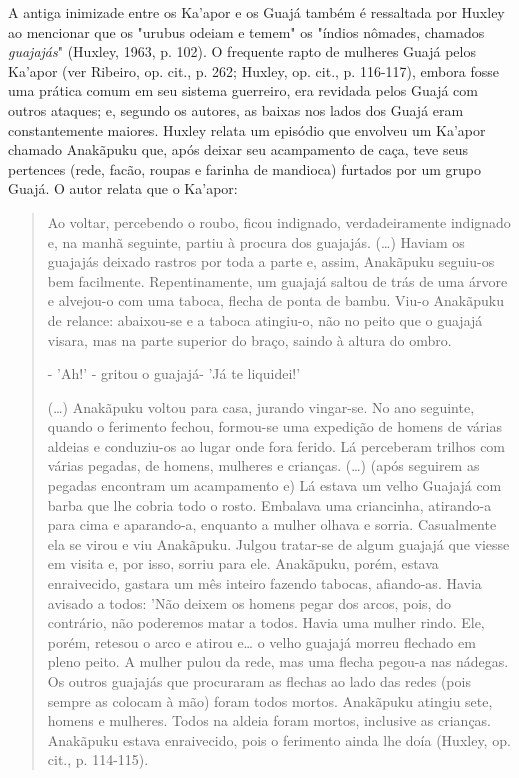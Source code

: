 A antiga inimizade entre os Ka'apor e os Guajá também é ressaltada por
Huxley ao mencionar que os "urubus odeiam e temem" os "índios nômades,
chamados \emph{guajajás}" (Huxley, 1963, p. 102). O frequente rapto de
mulheres Guajá pelos Ka'apor (ver Ribeiro, op. cit., p. 262; Huxley, op.
cit., p. 116-117), embora fosse uma prática comum em seu sistema
guerreiro, era revidada pelos Guajá com outros ataques; e, segundo os
autores, as baixas nos lados dos Guajá eram constantemente maiores.
Huxley relata um episódio que envolveu um Ka'apor chamado Anakãpuku que,
após deixar seu acampamento de caça, teve seus pertences (rede, facão,
roupas e farinha de mandioca) furtados por um grupo Guajá. O autor
relata que o Ka'apor:

\begin{quote}
Ao voltar, percebendo o roubo, ficou indignado, verdadeiramente
indignado e, na manhã seguinte, partiu à procura dos guajajás. (\ldots{})
Haviam os guajajás deixado rastros por toda a parte e, assim, Anakãpuku
seguiu-os bem facilmente. Repentinamente, um guajajá saltou de trás de
uma árvore e alvejou-o com uma taboca, flecha de ponta de bambu. Viu-o
Anakãpuku de relance: abaixou-se e a taboca atingiu-o, não no peito que
o guajajá visara, mas na parte superior do braço, saindo à altura do
ombro.

- 'Ah!' - gritou o guajajá- 'Já te liquidei!'

(\ldots{}) Anakãpuku voltou para casa, jurando vingar-se. No ano seguinte,
quando o ferimento fechou, formou-se uma expedição de homens de várias
aldeias e conduziu-os ao lugar onde fora ferido. Lá perceberam trilhos
com várias pegadas, de homens, mulheres e crianças. (\ldots{}) (após seguirem
as pegadas encontram um acampamento e) Lá estava um velho Guajajá com
barba que lhe cobria todo o rosto. Embalava uma criancinha, atirando-a
para cima e aparando-a, enquanto a mulher olhava e sorria. Casualmente
ela se virou e viu Anakãpuku. Julgou tratar-se de algum guajajá que
viesse em visita e, por isso, sorriu para ele. Anakãpuku, porém, estava
enraivecido, gastara um mês inteiro fazendo tabocas, afiando-as. Havia
avisado a todos: 'Não deixem os homens pegar dos arcos, pois, do
contrário, não poderemos matar a todos. Havia uma mulher rindo. Ele,
porém, retesou o arco e atirou e\ldots{} o velho guajajá morreu flechado em
pleno peito. A mulher pulou da rede, mas uma flecha pegou-a nas nádegas.
Os outros guajajás que procuraram as flechas ao lado das redes (pois
sempre as colocam à mão) foram todos mortos. Anakãpuku atingiu sete,
homens e mulheres. Todos na aldeia foram mortos, inclusive as crianças.
Anakãpuku estava enraivecido, pois o ferimento ainda lhe doía (Huxley,
op. cit., p. 114-115).
\end{quote}

